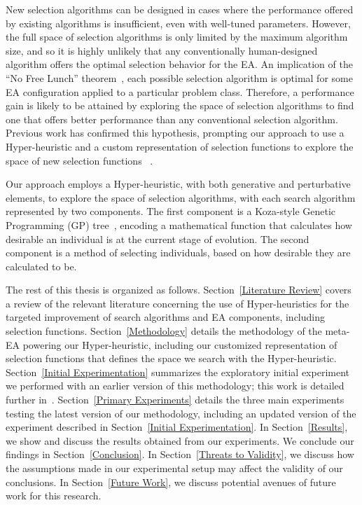\documentclass[times,12pt,titlepage]{mstogs}
\begin{document}
\begin{ThesisBody}
New selection algorithms can be designed in cases where the performance offered by existing algorithms is insufficient, even with well-tuned parameters. However, the full space of selection algorithms is only limited by the maximum algorithm size, and so it is highly unlikely that any conventionally human-designed algorithm offers the optimal selection behavior for the EA. An implication of the ``No Free Lunch'' theorem~\citep{wolpert1995noFreeLunch}, each possible selection algorithm is optimal for some EA configuration applied to a particular problem class. Therefore, a performance gain is likely to be attained by exploring the space of selection algorithms to find one that offers better performance than any conventional selection algorithm. Previous work has confirmed this hypothesis, prompting our approach to use a Hyper-heuristic and a custom representation of selection functions to explore the space of new selection functions ~\citep{woodward2011selection}.

Our approach employs a Hyper-heuristic, with both generative and perturbative elements, to explore the space of selection algorithms, with each search algorithm represented by two components. The first component is a Koza-style Genetic Programming (GP) tree~\citep{koza1994genetic}, encoding a mathematical function that calculates how desirable an individual is at the current stage of evolution. The second component is a method of selecting individuals, based on how desirable they are calculated to be.

The rest of this thesis is organized as follows. Section~\ref{Literature Review} covers a review of the relevant literature concerning the use of Hyper-heuristics for the targeted improvement of search algorithms and EA components, including selection functions. Section~\ref{Methodology} details the methodology of the meta-EA powering our Hyper-heuristic, including our customized representation of selection functions that defines the space we search with the Hyper-heuristic. Section~\ref{Initial Experimentation} summarizes the exploratory initial experiment we performed with an earlier version of this methodology; this work is detailed further in~\citep{richter2018adpsea}. Section~\ref{Primary Experiments} details the three main experiments testing the latest version of our methodology, including an updated version of the experiment described in Section~\ref{Initial Experimentation}. In Section~\ref{Results}, we show and discuss the results obtained from our experiments. We conclude our findings in Section~\ref{Conclusion}. In Section~\ref{Threats to Validity}, we discuss how the assumptions made in our experimental setup may affect the validity of our conclusions. In Section~\ref{Future Work}, we discuss potential avenues of future work for this research.


\end{ThesisBody}
\end{document}

